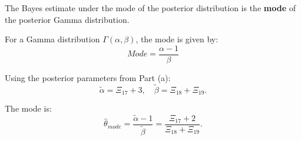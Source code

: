 The Bayes estimate under the mode of the posterior distribution is the \textbf{mode} of the posterior Gamma distribution. 

For a Gamma distribution $ \Gamma(\alpha, \beta) $, the mode is given by:
\begin{equation}
Mode = \frac{\alpha - 1}{\beta}
\end{equation}

Using the posterior parameters from Part (a):
\begin{equation}
\tilde{\alpha} = \Xi_{17} + 3, \quad \tilde{\beta} = \Xi_{18} + \Xi_{19}.
\end{equation}

The mode is:
\begin{equation}
\hat{\theta}_{mode} = \frac{\tilde{\alpha} - 1}{\tilde{\beta}} = \frac{\Xi_{17} + 2}{\Xi_{18} + \Xi_{19}}.
\end{equation}

